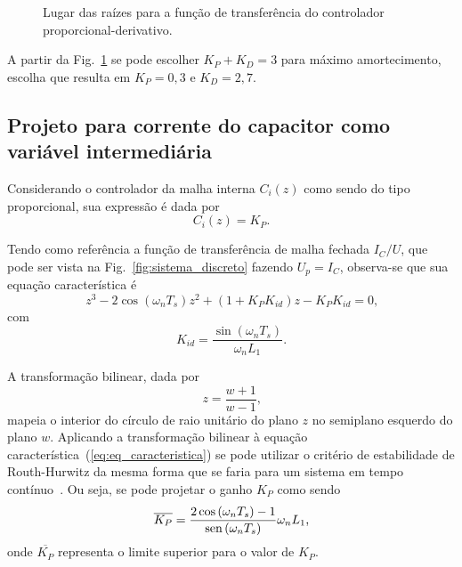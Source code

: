   \begin{figure}[htb]
    \renewcommand\figurename{Fig.}
    \caption{Lugar das raízes para a função de transferência do controlador proporcional-derivativo.}
    \label{fig:rlocus_vc_2}
  \end{figure}

  A partir da Fig.~\ref{fig:rlocus_vc_2} se pode escolher $K_P+K_D = 3$ para máximo amortecimento, escolha que resulta em $K_P = 0,3$ e $K_D = 2,7$.


\subsection{Projeto para corrente do capacitor como variável intermediária}

  Considerando o controlador da malha interna $C_i(z)$ como sendo do tipo proporcional, sua expressão é dada por
  \begin{equation}
    C_i(z) = K_P\text{.}
  \end{equation}

  Tendo como referência a função de transferência de malha fechada $I_C/U$, que pode ser vista na Fig.~\ref{fig:sistema_discreto} fazendo $U_p = I_C$, observa-se que sua equação característica é
  \begin{equation}
    z^3 - 2 \cos \left( \omega_n T_s \right) z^2 + \left( 1 + K_P K_{id} \right) z - K_P K_{id} = 0\text{,}
    \label{eq:eq_caracteristica}
  \end{equation}
  com
  \begin{equation}
    K_{id} = \frac{\sin(\omega_n T_s)}{\omega_n L_1}\text{.}
  \end{equation}

  A transformação bilinear, dada por
  \begin{equation}
    z = \frac{w + 1}{w - 1}\text{,}
  \end{equation}
  mapeia o interior do círculo de raio unitário do plano $z$ no semiplano esquerdo do plano $w$. Aplicando a transformação bilinear à equação característica~(\ref{eq:eq_caracteristica}) se pode utilizar o critério de estabilidade de Routh-Hurwitz da mesma forma que se faria para um sistema em tempo contínuo~\cite{ref:OGATA}. Ou seja, se pode projetar o ganho $K_P$ como sendo
  \begin{equation}
    \overline{K_P} = \frac{2 \cos \left( \omega_n T_s \right) - 1}
      {\operatorname{sen} \left( \omega_n T_s \right)} \omega_n L_1\text{,}
  \end{equation}
  onde $\overline{K_P}$ representa o limite superior para o valor de $K_P$.


